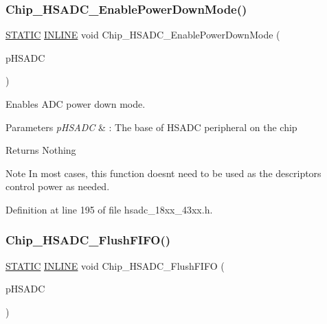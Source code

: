 \subsubsection{\texorpdfstring{Chip\+\_\+\+H\+S\+A\+D\+C\+\_\+\+Enable\+Power\+Down\+Mode()}{Chip\_HSADC\_EnablePowerDownMode()}}
{\footnotesize\ttfamily \hyperlink{group___l_p_c___types___public___macros_ga10b2d890d871e1489bb02b7e70d9bdfb}{S\+T\+A\+T\+IC} \hyperlink{spifi__18xx__43xx_8h_a2eb6f9e0395b47b8d5e3eeae4fe0c116}{I\+N\+L\+I\+NE} void Chip\+\_\+\+H\+S\+A\+D\+C\+\_\+\+Enable\+Power\+Down\+Mode (\begin{DoxyParamCaption}\item[{\hyperlink{struct_l_p_c___h_s_a_d_c___t}{L\+P\+C\+\_\+\+H\+S\+A\+D\+C\+\_\+T} $\ast$}]{p\+H\+S\+A\+DC }\end{DoxyParamCaption})}



Enables A\+DC power down mode. 


\begin{DoxyParams}{Parameters}
{\em p\+H\+S\+A\+DC} & \+: The base of H\+S\+A\+DC peripheral on the chip \\
\hline
\end{DoxyParams}
\begin{DoxyReturn}{Returns}
Nothing 
\end{DoxyReturn}
\begin{DoxyNote}{Note}
In most cases, this function doesn\textquotesingle{}t need to be used as the descriptors control power as needed. 
\end{DoxyNote}


Definition at line 195 of file hsadc\+\_\+18xx\+\_\+43xx.\+h.

\mbox{\label{group___h_s_a_d_c__18_x_x__43_x_x_ga9b6a95c8e73bf397768ea3f97ed7de25}} 
\subsubsection{\texorpdfstring{Chip\+\_\+\+H\+S\+A\+D\+C\+\_\+\+Flush\+F\+I\+F\+O()}{Chip\_HSADC\_FlushFIFO()}}
{\footnotesize\ttfamily \hyperlink{group___l_p_c___types___public___macros_ga10b2d890d871e1489bb02b7e70d9bdfb}{S\+T\+A\+T\+IC} \hyperlink{spifi__18xx__43xx_8h_a2eb6f9e0395b47b8d5e3eeae4fe0c116}{I\+N\+L\+I\+NE} void Chip\+\_\+\+H\+S\+A\+D\+C\+\_\+\+Flush\+F\+I\+FO (\begin{DoxyParamCaption}\item[{\hyperlink{struct_l_p_c___h_s_a_d_c___t}{L\+P\+C\+\_\+\+H\+S\+A\+D\+C\+\_\+T} $\ast$}]{p\+H\+S\+A\+DC }\end{DoxyParamCaption})}



